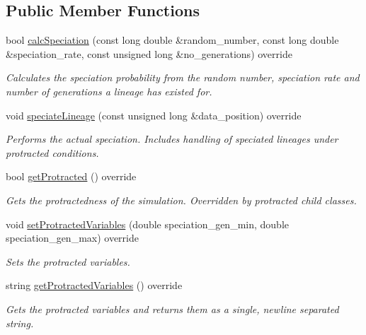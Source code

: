\subsection*{Public Member Functions}
\begin{DoxyCompactItemize}
\item 
bool \hyperlink{class_protracted_tree_af9690f122e77c0a60d363af3e818c9a2}{calc\+Speciation} (const long double \&random\+\_\+number, const long double \&speciation\+\_\+rate, const unsigned long \&no\+\_\+generations) override
\begin{DoxyCompactList}\small\item\em Calculates the speciation probability from the random number, speciation rate and number of generations a lineage has existed for. \end{DoxyCompactList}\item 
void \hyperlink{class_protracted_tree_aaa2f1db86b0fd49a69d0809bd1c1fb81}{speciate\+Lineage} (const unsigned long \&data\+\_\+position) override
\begin{DoxyCompactList}\small\item\em Performs the actual speciation. Includes handling of speciated lineages under protracted conditions. \end{DoxyCompactList}\item 
bool \hyperlink{class_protracted_tree_ab0bb05fbdeb2aa75a3d3128ded3d655b}{get\+Protracted} () override
\begin{DoxyCompactList}\small\item\em Gets the protractedness of the simulation. Overridden by protracted child classes. \end{DoxyCompactList}\item 
void \hyperlink{class_protracted_tree_a6e04aa92dd30e889a468d9b9fc6fd58d}{set\+Protracted\+Variables} (double speciation\+\_\+gen\+\_\+min, double speciation\+\_\+gen\+\_\+max) override
\begin{DoxyCompactList}\small\item\em Sets the protracted variables. \end{DoxyCompactList}\item 
string \hyperlink{class_protracted_tree_af0eca5eb2a790fcee9a0854e30088753}{get\+Protracted\+Variables} () override
\begin{DoxyCompactList}\small\item\em Gets the protracted variables and returns them as a single, newline separated string. \end{DoxyCompactList}\item 

\end{DoxyCompactItemize}
